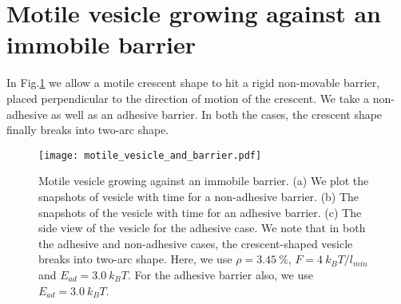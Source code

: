 \documentclass[pre,amsmath]{revtex4}
\begin{document}
\section{Motile vesicle growing against an immobile barrier}
\label{sec:barrier}
In Fig.\ref{barrier} we allow a motile crescent shape to hit a rigid non-movable barrier, placed perpendicular to the direction of motion of the crescent. We take a non-adhesive as well as an adhesive barrier. In both the cases, the crescent shape finally breaks into two-arc shape. 
\begin{figure}[ht]
\centering
\texttt{[image: motile\_vesicle\_and\_barrier.pdf]}
\caption{Motile vesicle growing against an immobile barrier. (a) We plot the snapshots of vesicle with time for a non-adhesive barrier. (b) The snapshots of the vesicle with time for an adhesive barrier. (c) The side view of the vesicle for the adhesive case. We note that in both the adhesive and non-adhesive cases, the crescent-shaped vesicle breaks into two-arc shape. Here, we use $\rho=3.45 ~\%$, $F=4 ~k_B T/l_{min}$ and $E_{ad}=3.0 ~k_B T$. For the adhesive barrier also, we use $E_{ad}=3.0 ~k_B T$. }
\label{barrier} 
\end{figure}
\end{document}
